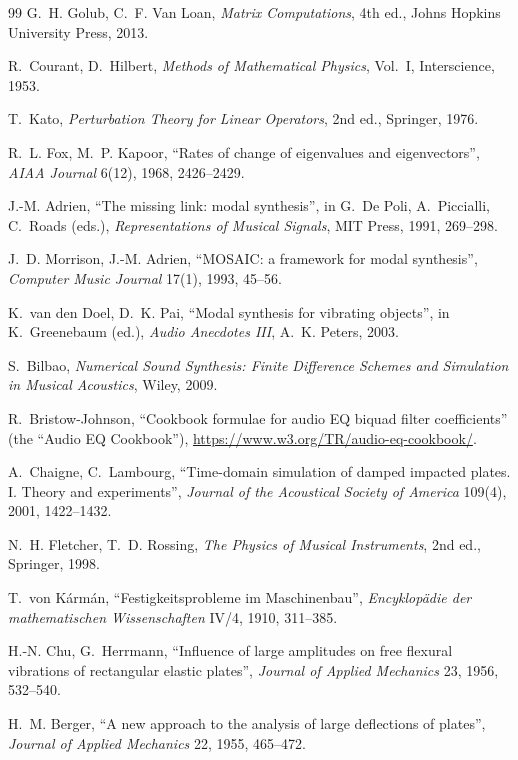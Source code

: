 \documentclass[11pt,a4paper]{article}
\begin{document}
\begin{thebibliography}{99}
 G.~H. Golub, C.~F. Van Loan, \emph{Matrix Computations},
  4th ed., Johns Hopkins University Press, 2013.

 R.~Courant, D.~Hilbert, \emph{Methods of Mathematical
  Physics}, Vol.~I, Interscience, 1953.

 T.~Kato, \emph{Perturbation Theory for Linear Operators},
  2nd ed., Springer, 1976.

 R.~L. Fox, M.~P. Kapoor, ``Rates of change of
  eigenvalues and eigenvectors'', \emph{AIAA Journal} 6(12), 1968,
  2426--2429.

 J.-M. Adrien, ``The missing link: modal synthesis'', in
  G.~De Poli, A.~Piccialli, C.~Roads (eds.), \emph{Representations of
  Musical Signals}, MIT Press, 1991, 269--298.

 J.~D. Morrison, J.-M. Adrien, ``MOSAIC: a framework for
  modal synthesis'', \emph{Computer Music Journal} 17(1), 1993, 45--56.

 K.~van den Doel, D.~K. Pai, ``Modal synthesis for
  vibrating objects'', in K.~Greenebaum (ed.), \emph{Audio Anecdotes III},
  A.~K. Peters, 2003.

 S.~Bilbao, \emph{Numerical Sound Synthesis: Finite
  Difference Schemes and Simulation in Musical Acoustics}, Wiley, 2009.

 R.~Bristow-Johnson, ``Cookbook formulae for audio EQ biquad
  filter coefficients'' (the ``Audio EQ Cookbook''),
  \url{https://www.w3.org/TR/audio-eq-cookbook/}.

 A.~Chaigne, C.~Lambourg, ``Time-domain simulation of
  damped impacted plates. I. Theory and experiments'', \emph{Journal of
  the Acoustical Society of America} 109(4), 2001, 1422--1432.

 N.~H. Fletcher, T.~D. Rossing, \emph{The
  Physics of Musical Instruments}, 2nd ed., Springer, 1998.

 T.~von K\'arm\'an, ``Festigkeitsprobleme im
  Maschinenbau'', \emph{Encyklop\"adie der mathematischen Wissenschaften}
  IV/4, 1910, 311--385.

 H.-N. Chu, G.~Herrmann, ``Influence of large
  amplitudes on free flexural vibrations of rectangular elastic plates'',
  \emph{Journal of Applied Mechanics} 23, 1956, 532--540.

 H.~M. Berger, ``A new approach to the analysis of large
  deflections of plates'', \emph{Journal of Applied Mechanics} 22, 1955,
  465--472.


\end{thebibliography}
\end{document}

